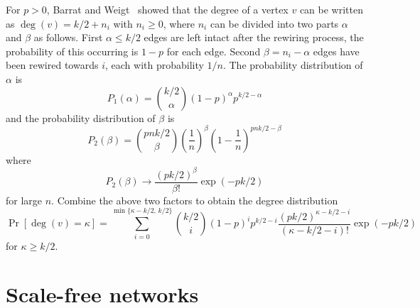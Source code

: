 For $p > 0$, Barrat and Weigt~\cite{BarratWeigt2000} showed that the
degree of a vertex $v$ can be written as $\deg(v) = k/2 + n_i$ with
$n_i \geq 0$, where $n_i$ can be divided into two parts $\alpha$ and
$\beta$ as follows. First $\alpha \leq k/2$ edges are left intact
after the rewiring process, the probability of this occurring is
$1 - p$ for each edge. Second $\beta = n_i - \alpha$ edges have been
rewired towards $i$, each with probability $1/n$. The probability
distribution of $\alpha$ is
\[
P_1(\alpha)
=
\binom{k/2}{\alpha} (1 - p)^\alpha p^{k/2 - \alpha}
\]
and the probability distribution of $\beta$ is
\[
P_2(\beta)
=
\binom{pnk/2}{\beta} \left( \frac{1}{n} \right)^\beta
\left( 1 - \frac{1}{n} \right)^{pnk/2 - \beta}
\]
where
\[
P_2(\beta)
\to
\frac{(pk/2)^\beta}{\beta!} \exp(-pk/2)
\]
for large $n$. Combine the above two factors to obtain the degree
distribution
\[
\Pr[\deg(v) = \kappa]
=
\sum_{i=0}^{\min\{\kappa - k/2,\, k/2\}}
\binom{k/2}{i} (1 - p)^i p^{k/2 - i}
\frac{(pk/2)^{\kappa - k/2 - i}} {(\kappa - k/2 - i)!}
\exp(-pk/2)
\]
for $\kappa \geq k/2$.



\section{Scale-free networks}


